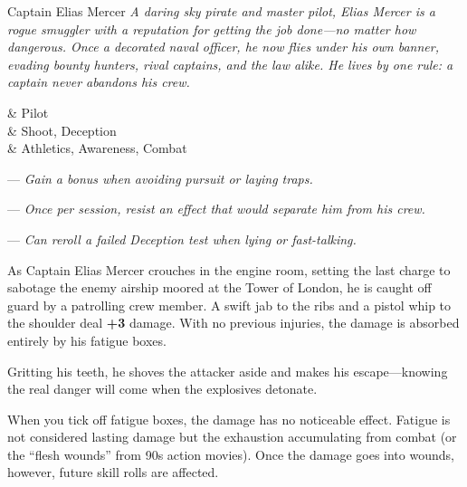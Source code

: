 \begin{NPC}{Captain Elias Mercer}
	\emph{A daring sky pirate and master pilot, Elias Mercer is a rogue smuggler with a reputation for getting the job done—no matter how dangerous. Once a decorated naval officer, he now flies under his own banner, evading bounty hunters, rival captains, and the law alike. He lives by one rule: a captain never abandons his crew.}
  
	\vspace{0.5\baselineskip}

	\begin{SkillsBox}
		\Expert  & Pilot \\
		\Skilled & Shoot, Deception \\
		\Novice  & Athletics, Awareness, Combat \\
	\end{SkillsBox}
  
	\begin{TraitsBox}
	  \item[Always One Step Ahead] — \emph{Gain a bonus when avoiding pursuit or laying traps.}
	  \item[A Captain Never Abandons His Crew] — \emph{Once per session, resist an effect that would separate him from his crew.}
	  \item[Knows Every Trick in the Book] — \emph{Can reroll a failed Deception test when lying or fast-talking.}
	\end{TraitsBox}
  
	\DamageBox
  \end{NPC}
  
\begin{Example}
	As Captain Elias Mercer crouches in the engine room, setting the last charge to sabotage the enemy airship moored at the Tower of London, he is caught off guard by a patrolling crew member. A swift jab to the ribs and a pistol whip to the shoulder deal \textbf{+3} damage. With no previous injuries, the damage is absorbed entirely by his fatigue boxes. 
	
	\vspace{0.5\baselineskip}
	\DamageBox[fatigue=3]

	\noindent
	Gritting his teeth, he shoves the attacker aside and makes his escape—knowing the real danger will come when the explosives detonate.
\end{Example}


When you tick off fatigue boxes, the damage has no noticeable effect. Fatigue is not considered lasting damage but the exhaustion accumulating from combat (or the ``flesh wounds'' from 90s action movies). Once the damage goes into wounds, however, future skill rolls are affected.


